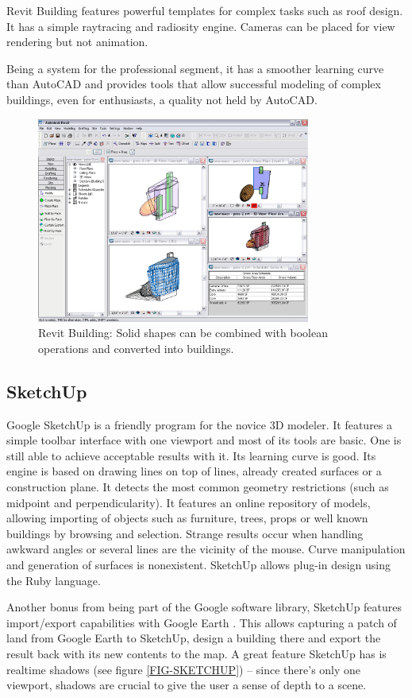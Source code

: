 Revit Building features powerful templates for complex tasks such as roof design.
It has a simple raytracing and radiosity engine.
Cameras can be placed for view rendering but not animation.

Being a system for the professional segment, it has a smoother learning curve than
AutoCAD and provides tools that allow successful modeling of complex buildings,
even for enthusiasts, a quality not held by AutoCAD.

\begin{figure}[!ht]
    \centering
    \includegraphics[width=9cm]{gfx/revit-1.png}
    \caption{Revit Building: Solid shapes can be combined with boolean operations and converted into buildings.}
    \label{FIG-REVIT}
\end{figure}

\subsection{SketchUp}
Google SketchUp \cite{SITE-SKETCHUP} is a friendly program for the novice 3D modeler.
It features a simple toolbar interface with one viewport and most of its tools are basic.
One is still able to achieve acceptable results with it.
Its learning curve is good.
Its engine is based on drawing lines on top of lines,
already created surfaces or a construction plane.
It detects the most common geometry restrictions (such as midpoint and perpendicularity).
It features an online repository of models, allowing importing of objects such as
furniture, trees, props or well known buildings by browsing and selection.
Strange results occur when handling awkward angles
or several lines are the vicinity of the mouse.
Curve manipulation and generation of surfaces is nonexistent.
SketchUp allows plug-in design using the Ruby language.

Another bonus from being part of the Google software library, SketchUp features import/export capabilities with Google Earth \cite{SITE-EARTH}.
This allows capturing a patch of land from Google Earth to SketchUp, design a building there and export the result
back with its new contents to the map.
A great feature SketchUp has is realtime shadows (see figure \ref{FIG-SKETCHUP})
-- since there's only one viewport, shadows are crucial to give the user a sense of depth to a scene.

